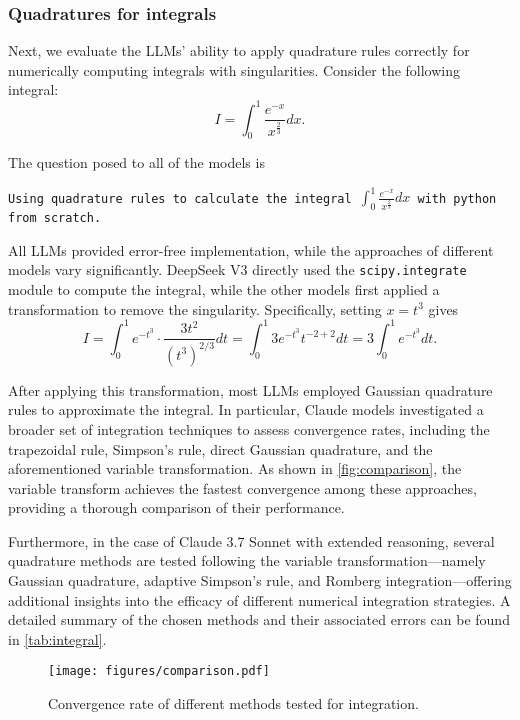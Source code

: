 \documentclass{article}
\begin{document}
\subsubsection{Quadratures for integrals}
Next, we evaluate the LLMs' ability to apply quadrature rules correctly for numerically computing integrals with singularities. Consider the following integral:
\begin{equation*}
    I = \int_{0}^{1}\frac{e^{-x}}{x^{\frac{2}{3}}}dx.
\end{equation*}

The question posed to all of the models is

\texttt{Using quadrature rules to calculate the integral 
$\int_{0}^{1}\frac{e^{-x}}{x^{\frac{2}{3}}}dx$ with python from scratch.
}

All LLMs provided error-free implementation, while the approaches of different models vary significantly. DeepSeek V3 directly used the \texttt{scipy.integrate} module to compute the integral, while the other models first applied a transformation to remove the singularity. Specifically, setting $x = t^{3}$ gives
\begin{equation*}
    I = \int_{0}^{1} e^{-t^3} \cdot \frac{3t^2}{(t^3)^{2/3}} dt
= \int_{0}^{1} 3e^{-t^3} t^{-2+2} dt
= 3 \int_{0}^{1} e^{-t^3} dt.
\end{equation*}

After applying this transformation, most LLMs employed Gaussian quadrature rules to approximate the integral. In particular, Claude models investigated a broader set of integration techniques to assess convergence rates, including the trapezoidal rule, Simpson’s rule, direct Gaussian quadrature, and the aforementioned variable transformation. As shown in \autoref{fig:comparison}, the variable transform achieves the fastest convergence among these approaches, providing a thorough comparison of their performance.

Furthermore, in the case of Claude 3.7 Sonnet with extended reasoning, several quadrature methods are tested following the variable transformation—namely Gaussian quadrature, adaptive Simpson’s rule, and Romberg integration—offering additional insights into the efficacy of different numerical integration strategies. A detailed summary of the chosen methods and their associated errors can be found in \autoref{tab:integral}.

\begin{figure}
    \centering
\texttt{[image: figures/comparison.pdf]}
    \caption{Convergence rate of different methods tested for integration.}
    \label{fig:comparison}
\end{figure}
\end{document}

